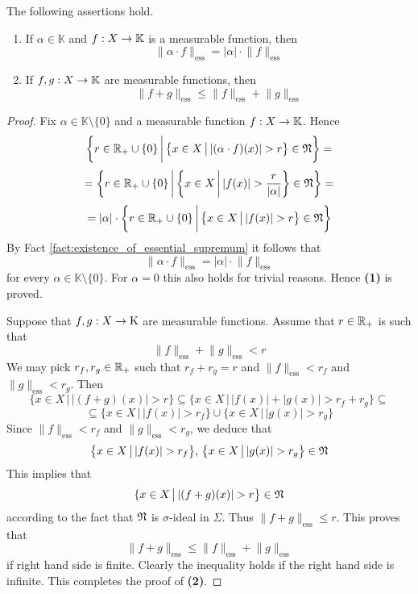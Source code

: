 \begin{proposition}\label{proposition:essential_supremum_is_a_seminorm}
    The following assertions hold.
    \begin{enumerate}[label=\emph{\textbf{(\arabic*)}}, leftmargin=*]
        \item If $\alpha \in \mathbb{K}$ and $f:X\rightarrow \mathbb{K}$ is a measurable function, then
              $$\lVert \alpha \cdot f\rVert_{\mathrm{ess}} = |\alpha|\cdot \lVert f\rVert_{\mathrm{ess}}$$
        \item If $f,g:X\rightarrow \mathbb{K}$ are measurable functions, then
              $$\lVert f + g \rVert_{\mathrm{ess}} \leq \lVert f \rVert_{\mathrm{ess}} + \lVert g \rVert_{\mathrm{ess}}$$
    \end{enumerate}
\end{proposition}
\begin{proof}
    Fix $\alpha \in \mathbb{K}\setminus \{0\}$ and a measurable function $f:X\rightarrow \mathbb{K}$. Hence
    $$\bigg\{r\in {\mathbb R}_+ \cup \{0\}\,\bigg|\,\big\{x\in X\,\big|\,|(\alpha \cdot f)(x)| > r\big\}\in {\mathfrak N}\bigg\} =$$
    $$= \bigg\{r \in {\mathbb R}_+\cup \{0\}\,\bigg|\,\bigg\{x\in X\,\bigg|\,|f(x)| > \frac{r}{|\alpha|}\bigg\} \in {\mathfrak N}\bigg\} = $$
    $$= |\alpha| \cdot \bigg\{r \in {\mathbb R}_+\cup \{0\}\,\bigg|\,\big\{x\in X\,\big|\,|f(x)| > r\big\}\in {\mathfrak N}\bigg\}$$
    By Fact \ref{fact:existence_of_essential_supremum} it follows that
    $$\lVert \alpha \cdot f\rVert_{\mathrm{ess}} = |\alpha|\cdot \lVert f\rVert_{\mathrm{ess}}$$
    for every $\alpha \in \mathbb{K}\setminus \{0\}$. For $\alpha = 0$ this also holds for trivial reasons. Hence \textbf{(1)} is proved.

    Suppose that $f,g:X\rightarrow \mathrm{K}$ are measurable functions. Assume that $r\in {\mathbb R}_+$ is such that
    $$\lVert f \rVert_{\mathrm{ess}} + \lVert g \rVert_{\mathrm{ess}} < r$$
    We may pick $r_f,r_g\in {\mathbb R}_+$ such that $r_f + r_g = r$ and $\lVert f \rVert_{\mathrm{ess}} < r_f$ and $\lVert g \rVert_{\mathrm{ess}} < r_g$. Then
    $$\{x\in X\,\big|\,|(f + g)(x)| > r \big\} \subseteq \big\{x\in X\,\big|\,|f(x)| + |g(x)| > r_f + r_g \big\} \subseteq $$
    $$\subseteq \big\{x\in X\,\big|\,|f(x)|  > r_f\big\} \cup \big\{x\in X\,\big|\,|g(x)|  > r_g\big\}$$
    Since $\lVert f \rVert_{\mathrm{ess}} < r_f$ and $\lVert g \rVert_{\mathrm{ess}} < r_g$, we deduce that
    $$\big\{x\in X\,\big|\,|f(x)|  > r_f\big\},\,\big\{x\in X\,\big|\,|g(x)| > r_g\big\}\in {\mathfrak N}$$
    This implies that
    $$\{x\in X\,\big|\,|(f + g)(x)| > r\big\} \in {\mathfrak N}$$
    according to the fact that ${\mathfrak N}$ is $\sigma$-ideal in $\Sigma$. Thus $\lVert f + g\rVert_{\mathrm{ess}} \leq r$. This proves that
    $$\lVert f + g \rVert_{\mathrm{ess}} \leq \lVert f \rVert_{\mathrm{ess}} + \lVert g \rVert_{\mathrm{ess}}$$
    if right hand side is finite. Clearly the inequality holds if the right hand side is infinite. This completes the proof of \textbf{(2)}.
\end{proof}

